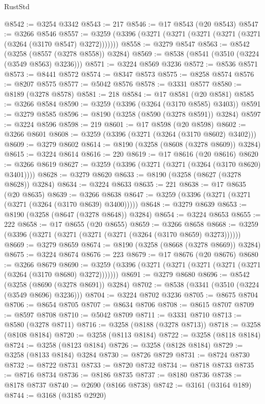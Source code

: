 \begin{lexlean}{RustStd}
\begin{coremodule}
@8542 := @3254 @3342
@8543 := 217
@8546 := @17 @8543 (@20 @8543)
@8547 := @3266 @8546
@8557 := @3259 (@3396 (@3271 (@3271 (@3271 (@3271 (@3271 (@3264 (@3170 @8547) @3272)))))))
@8558 := @3279 @8547
@8563 := @8542 (@3258 (@8557 (@3278 @8558)) @3284)
@8569 := @8538 (@8541 (@3510 (@3224 (@3549 @8563) @3236)))
@8571 := @3224 @8569 @3236
@8572 := @8536 @8571
@8573 := @8441 @8572
@8574 := @8347 @8573
@8575 := @8258 @8574
@8576 := @8207 @8575
@8577 := @5042 @8576
@8578 := @3331 @8577
@8580 := @8189 (@3278 @8578)
@8581 := 218
@8584 := @17 @8581 (@20 @8581)
@8585 := @3266 @8584
@8590 := @3259 (@3396 (@3264 (@3170 @8585) @3403))
@8591 := @3279 @8585
@8596 := @8190 (@3258 (@8590 (@3278 @8591)) @3284)
@8597 := @3224 @8596
@8598 := 219
@8601 := @17 @8598 (@20 @8598)
@8602 := @3266 @8601
@8608 := @3259 (@3396 (@3271 (@3264 (@3170 @8602) @3402)))
@8609 := @3279 @8602
@8614 := @8190 (@3258 (@8608 (@3278 @8609)) @3284)
@8615 := @3224 @8614
@8616 := 220
@8619 := @17 @8616 (@20 @8616)
@8620 := @3266 @8619
@8627 := @3259 (@3396 (@3271 (@3271 (@3264 (@3170 @8620) @3401))))
@8628 := @3279 @8620
@8633 := @8190 (@3258 (@8627 (@3278 @8628)) @3284)
@8634 := @3224 @8633
@8635 := 221
@8638 := @17 @8635 (@20 @8635)
@8639 := @3266 @8638
@8647 := @3259 (@3396 (@3271 (@3271 (@3271 (@3264 (@3170 @8639) @3400)))))
@8648 := @3279 @8639
@8653 := @8190 (@3258 (@8647 (@3278 @8648)) @3284)
@8654 := @3224 @8653
@8655 := 222
@8658 := @17 @8655 (@20 @8655)
@8659 := @3266 @8658
@8668 := @3259 (@3396 (@3271 (@3271 (@3271 (@3271 (@3264 (@3170 @8659) @3273))))))
@8669 := @3279 @8659
@8674 := @8190 (@3258 (@8668 (@3278 @8669)) @3284)
@8675 := @3224 @8674
@8676 := 223
@8679 := @17 @8676 (@20 @8676)
@8680 := @3266 @8679
@8690 := @3259 (@3396 (@3271 (@3271 (@3271 (@3271 (@3271 (@3264 (@3170 @8680) @3272)))))))
@8691 := @3279 @8680
@8696 := @8542 (@3258 (@8690 (@3278 @8691)) @3284)
@8702 := @8538 (@3341 (@3510 (@3224 (@3549 @8696) @3236)))
@8704 := @3224 @8702 @3236
@8705 := @8675 @8704
@8706 := @8654 @8705
@8707 := @8634 @8706
@8708 := @8615 @8707
@8709 := @8597 @8708
@8710 := @5042 @8709
@8711 := @3331 @8710
@8713 := @8580 (@3278 @8711)
@8716 := @3258 (@8188 (@3278 @8713))
@8718 := @3258 (@8108 @8184)
@8720 := @3258 (@8113 @8184)
@8722 := @3258 (@8118 @8184)
@8724 := @3258 (@8123 @8184)
@8726 := @3258 (@8128 @8184)
@8729 := @3258 (@8133 @8184) @3284
@8730 := @8726 @8729
@8731 := @8724 @8730
@8732 := @8722 @8731
@8733 := @8720 @8732
@8734 := @8718 @8733
@8735 := @8716 @8734
@8736 := @8186 @8735
@8737 := @8180 @8736
@8738 := @8178 @8737
@8740 := @2690 (@8166 @8738)
@8742 := @3161 (@3164 @189)
@8744 := @3168 (@3185 @2920)

\end{coremodule}
\end{lexlean}
